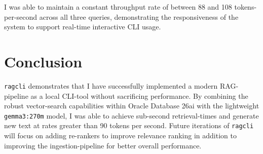\documentclass[11pt,a4paper]{article}
\begin{document}
I was able to maintain a constant throughput rate of between 88 and 108 tokens-per-second across all three queries, demonstrating the responsiveness of the system to support real-time interactive CLI usage.

\section{Conclusion}

\texttt{ragcli} demonstrates that I have successfully implemented a modern RAG-pipeline as a local CLI-tool without sacrificing performance. By combining the robust vector-search capabilities within Oracle Database 26ai with the lightweight \texttt{gemma3:270m} model, I was able to achieve sub-second retrieval-times and generate new text at rates greater than 90 tokens per second. Future iterations of \texttt{ragcli} will focus on adding re-rankers to improve relevance ranking in addition to improving the ingestion-pipeline for better overall performance.
\end{document}
